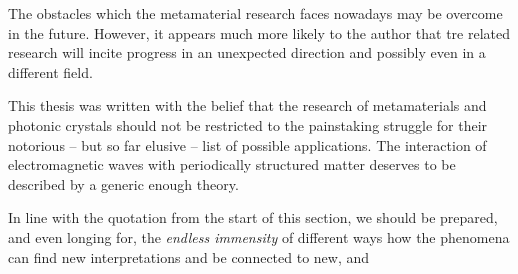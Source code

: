 The obstacles which the metamaterial research faces nowadays may be overcome in the future. However, it appears much more likely to the author that tre related research will incite progress in an unexpected direction and possibly even in a different field.

This thesis was written with the belief that the research of metamaterials and photonic crystals should not be restricted to the painstaking struggle for their notorious -- but so far elusive -- list of possible applications. The interaction of electromagnetic waves with periodically structured matter deserves to be %
described by a generic enough theory.

In line with the quotation from the start of this section, we should be prepared, and even longing for, the \textit{endless immensity} of different 
ways how the phenomena can find new interpretations and be connected to new, and 



